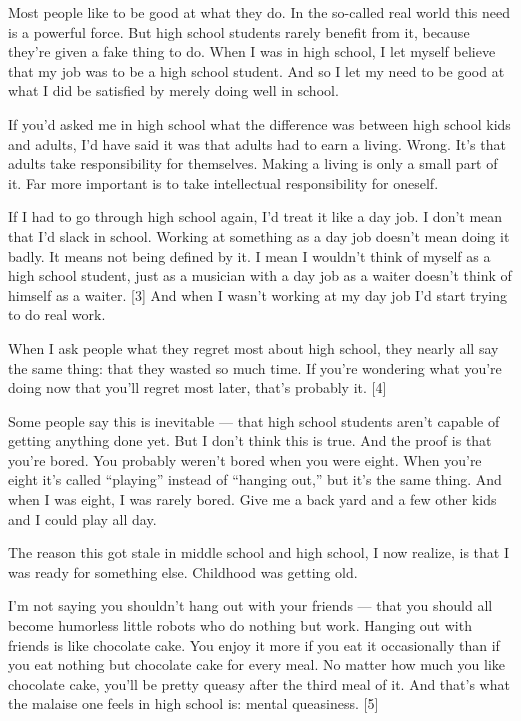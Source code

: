Most people like to be good at what they do. In the so-called real world
this need is a powerful force. But high school students rarely benefit
from it, because they're given a fake thing to do. When I was in high
school, I let myself believe that my job was to be a high school
student. And so I let my need to be good at what I did be satisfied by
merely doing well in school.

If you'd asked me in high school what the difference was between high
school kids and adults, I'd have said it was that adults had to earn a
living. Wrong. It's that adults take responsibility for themselves.
Making a living is only a small part of it. Far more important is to
take intellectual responsibility for oneself.

If I had to go through high school again, I'd treat it like a day job. I
don't mean that I'd slack in school. Working at something as a day job
doesn't mean doing it badly. It means not being defined by it. I mean I
wouldn't think of myself as a high school student, just as a musician
with a day job as a waiter doesn't think of himself as a waiter. {[}3{]}
And when I wasn't working at my day job I'd start trying to do real
work.

When I ask people what they regret most about high school, they nearly
all say the same thing: that they wasted so much time. If you're
wondering what you're doing now that you'll regret most later, that's
probably it. {[}4{]}

Some people say this is inevitable --- that high school students aren't
capable of getting anything done yet. But I don't think this is true.
And the proof is that you're bored. You probably weren't bored when you
were eight. When you're eight it's called ``playing'' instead of
``hanging out,'' but it's the same thing. And when I was eight, I was
rarely bored. Give me a back yard and a few other kids and I could play
all day.

The reason this got stale in middle school and high school, I now
realize, is that I was ready for something else. Childhood was getting
old.

I'm not saying you shouldn't hang out with your friends --- that you
should all become humorless little robots who do nothing but work.
Hanging out with friends is like chocolate cake. You enjoy it more if
you eat it occasionally than if you eat nothing but chocolate cake for
every meal. No matter how much you like chocolate cake, you'll be pretty
queasy after the third meal of it. And that's what the malaise one feels
in high school is: mental queasiness. {[}5{]}

